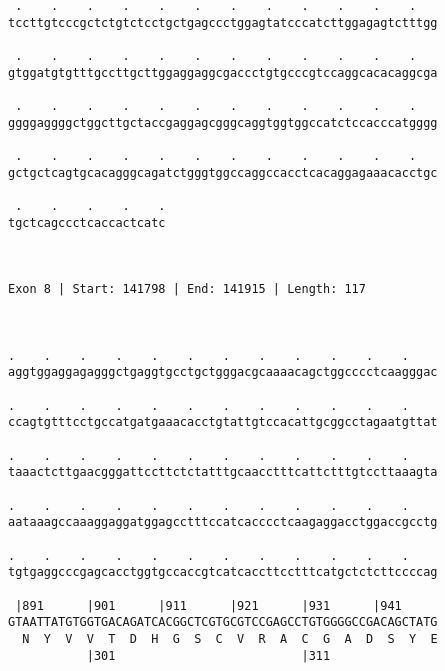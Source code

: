 \documentclass{article}
\begin{document}
\begin{Verbatim}
 .    .    .    .    .    .    .    .    .    .    .    .   
tccttgtcccgctctgtctcctgctgagccctggagtatcccatcttggagagtctttgg
                                                            
 .    .    .    .    .    .    .    .    .    .    .    .   
gtggatgtgtttgccttgcttggaggaggcgaccctgtgcccgtccaggcacacaggcga
                                                            
 .    .    .    .    .    .    .    .    .    .    .    .   
ggggaggggctggcttgctaccgaggagcgggcaggtggtggccatctccacccatgggg
                                                            
 .    .    .    .    .    .    .    .    .    .    .    .   
gctgctcagtgcacagggcagatctgggtggccaggccacctcacaggagaaacacctgc
                                                            
 .    .    .    .    .
tgctcagccctcaccactcatc
                      
                      
 
Exon 8 | Start: 141798 | End: 141915 | Length: 117



.    .    .    .    .    .    .    .    .    .    .    .    
aggtggaggagagggctgaggtgcctgctgggacgcaaaacagctggcccctcaagggac
                                                            
.    .    .    .    .    .    .    .    .    .    .    .    
ccagtgtttcctgccatgatgaaacacctgtattgtccacattgcggcctagaatgttat
                                                            
.    .    .    .    .    .    .    .    .    .    .    .    
taaactcttgaacgggattccttctctatttgcaacctttcattctttgtccttaaagta
                                                            
.    .    .    .    .    .    .    .    .    .    .    .    
aataaagccaaaggaggatggagcctttccatcacccctcaagaggacctggaccgcctg
                                                            
.    .    .    .    .    .    .    .    .    .    .    .    
tgtgaggcccgagcacctggtgccaccgtcatcaccttcctttcatgctctcttccccag
                                                            
 |891      |901      |911      |921      |931      |941     
GTAATTATGTGGTGACAGATCACGGCTCGTGCGTCCGAGCCTGTGGGGCCGACAGCTATG
  N  Y  V  V  T  D  H  G  S  C  V  R  A  C  G  A  D  S  Y  E
           |301                          |311               
  

\end{Verbatim}
\end{document}
